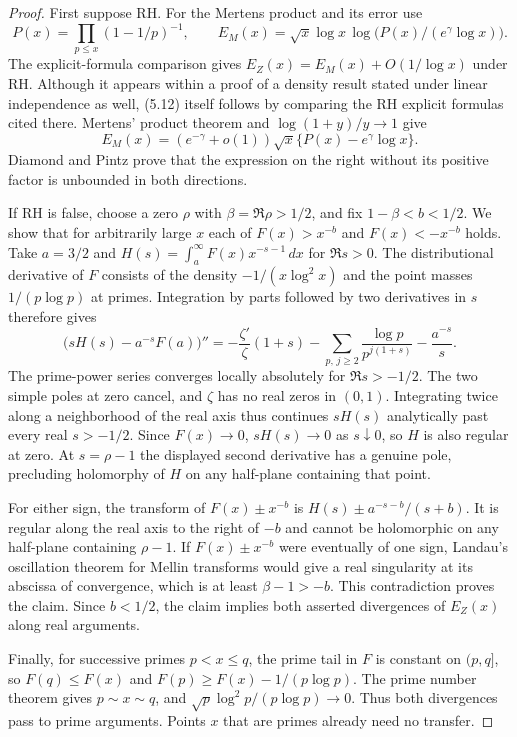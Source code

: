 \documentclass[11pt,a4paper]{article}
\begin{document}
\begin{proof}
First suppose RH. For the Mertens product and its error use
\[
P(x)=\prod_{p\le x}(1-1/p)^{-1},\qquad
E_M(x)=\sqrt{x}\log x\,\log\bigl(P(x)/(e^\gamma\log x)\bigr).
\]
The explicit-formula comparison \cite[(5.12)]{lmp} gives
$E_Z(x)=E_M(x)+O(1/\log x)$ under RH.  Although it appears within
a proof of a density result stated under linear independence as well,
(5.12) itself follows by comparing the RH explicit formulas cited there.
Mertens' product theorem and $\log(1+y)/y\to1$ give
\[
 E_M(x)= (e^{-\gamma}+o(1))\sqrt{x}\{P(x)-e^\gamma\log x\}.
\]
Diamond and Pintz \cite[Thm.~1.1]{dp} prove that the expression on
the right without its positive factor is unbounded in both directions.

If RH is false, choose a zero $\rho$ with $\beta=\Re\rho>1/2$, and
fix $1-\beta<b<1/2$.  We show that for arbitrarily large $x$ each of
$F(x)>x^{-b}$ and $F(x)<-x^{-b}$ holds. Take $a=3/2$ and
$H(s)=\int_a^\infty F(x)x^{-s-1}\,dx$ for $\Re s>0$.
The distributional derivative of $F$ consists of the density
$-1/(x\log^2x)$ and the point masses $1/(p\log p)$ at primes.
Integration by parts followed by two derivatives in $s$ therefore gives
\[
 \big(sH(s)-a^{-s}F(a)\big)''
 =-\frac{\zeta'}{\zeta}(1+s)
 -\sum_{p,\,j\ge2}\frac{\log p}{p^{j(1+s)}}-\frac{a^{-s}}s.
\]
The prime-power series converges locally absolutely for $\Re s>-1/2$.
The two simple poles at zero cancel, and $\zeta$ has no real zeros in
$(0,1)$. Integrating twice along a neighborhood of the real axis thus
continues $sH(s)$ analytically past every real $s>-1/2$.
Since $F(x)\to0$, $sH(s)\to0$ as $s\downarrow0$, so $H$ is also
regular at zero. At $s=\rho-1$ the displayed second derivative has
a genuine pole, precluding holomorphy of $H$ on any half-plane
containing that point.

For either sign, the transform of $F(x)\pm x^{-b}$ is
$H(s)\pm a^{-s-b}/(s+b)$. It is regular along the real axis to the
right of $-b$ and cannot be holomorphic on any half-plane containing
$\rho-1$. If $F(x)\pm x^{-b}$ were eventually of one sign,
Landau's oscillation theorem for Mellin transforms
\cite[Sec.~3]{dp} would give a real singularity at its abscissa of
convergence, which is at least $\beta-1>-b$.  This contradiction
proves the claim. Since $b<1/2$, the claim implies both asserted
divergences of $E_Z(x)$ along real arguments.

Finally, for successive primes $p<x\le q$, the prime tail in $F$
is constant on $(p,q]$, so $F(q)\le F(x)$ and
$F(p)\ge F(x)-1/(p\log p)$. The prime number theorem gives
$p\sim x\sim q$, and $\sqrt{p}\log^2p/(p\log p)\to0$.
Thus both divergences pass to prime arguments. Points $x$ that are
primes already need no transfer.
\end{proof}
\end{document}
